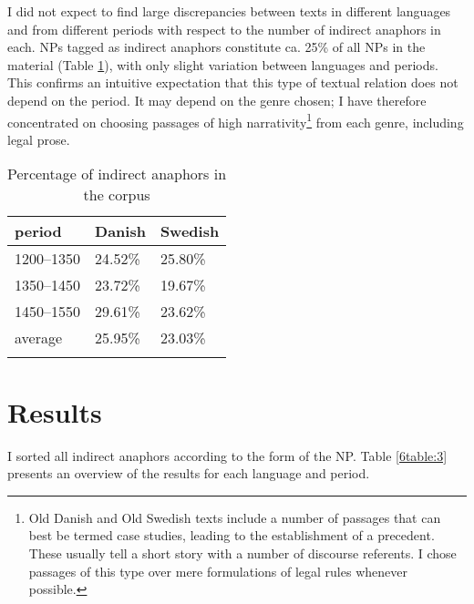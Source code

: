 \documentclass[output=paper]{langsci/langscibook}
\begin{document}
{
I did not expect to find large discrepancies between texts in different languages and from different periods with respect to the number of indirect anaphors in each. NPs tagged as indirect anaphors constitute ca. 25\% of all NPs in the material (Table \ref{6table:2}), with only slight variation between languages and periods. This confirms an intuitive expectation that this type of textual relation does not depend on the period. It may depend on the genre chosen; I have therefore concentrated on choosing passages of high narrativity\footnote{Old Danish and Old Swedish texts include a number of passages that can best be termed case studies, leading to the establishment of a precedent. These usually tell a short story with a number of discourse referents. I chose passages of this type over mere formulations of legal rules whenever possible.} from each genre, including legal prose. 
}

\begin{table}
\begin{tabularx}{\textwidth}{XXl}
\lsptoprule
{\textbf{period}} & {\textbf{Danish}} & {\textbf{Swedish}}\\ 
\midrule
1200--1350	& 24.52\%		& 25.80\% \\ 
1350--1450	& 23.72\%		& 19.67\% \\ 
1450--1550	& 29.61\%		& 23.62\% \\ 
average		& 25.95\%		& 23.03\% \\ 
\lspbottomrule
\end{tabularx}
\caption{Percentage of indirect anaphors in the corpus}\label{6table:2}
\end{table}


\section{Results}\label{6sec:4}

I sorted all indirect anaphors according to the form of the NP. Table \ref{6table:3} presents an overview of the results for each language and period.
\end{document}
